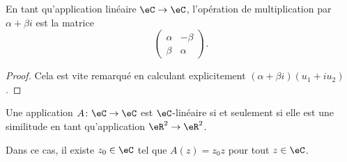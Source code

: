 \begin{lemma}       \label{LEMooJNFEooZCbJMo}
	En tant qu'application linéaire \( \eC\to \eC\), l'opération de multiplication par \( \alpha+\beta i\) est la matrice
	\begin{equation}
		\begin{pmatrix}
			\alpha & -\beta \\
			\beta  & \alpha
		\end{pmatrix}.
	\end{equation}
\end{lemma}

\begin{proof}
	Cela est vite remarqué en calculant explicitement \( (\alpha+\beta i)(u_1+iu_2)\).
\end{proof}

\begin{lemma}       \label{LEMooKIOZooEUxfsB}
	Une application \( A\colon \eC\to \eC\) est \( \eC\)-linéaire si et seulement si elle est une similitude en tant qu'application \( \eR^2\to \eR^2\).

	Dans ce cas, il existe \( z_0\in \eC\) tel que \( A(z)=z_0z\) pour tout \( z\in \eC\).
\end{lemma}

